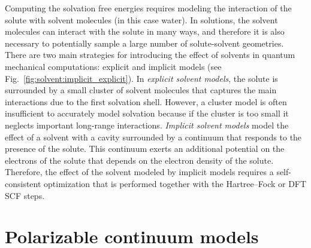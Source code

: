 \documentclass[../Main/notes.tex]{subfiles}
\begin{document}
Computing the solvation free energies requires modeling the interaction of the solute with solvent molecules (in this case water).
In solutions, the solvent molecules can interact with the solute in many ways, and therefore it is also necessary to potentially sample a large number of solute-solvent geometries.
There are two main strategies for introducing the effect of solvents in quantum mechanical computations: explicit and implicit models (see Fig.~\ref{fig:solvent:implicit_explicit}).
In \emph{explicit solvent models}, the solute is surrounded by a small cluster of solvent molecules that captures the main interactions due to the first solvation shell.
However, a cluster model is often insufficient to accurately model solvation because if the cluster is too small it neglects important long-range interactions.
\emph{Implicit solvent models} model the effect of a solvent with a cavity surrounded by a continuum that responds to the presence of the solute. This continuum exerts an additional potential on the electrons of the solute that depends on the electron density of the solute.
Therefore, the effect of the solvent modeled by implicit models requires a self-consistent optimization that is performed together with the Hartree--Fock or DFT SCF steps.

\section{Polarizable continuum models}

\end{document}
